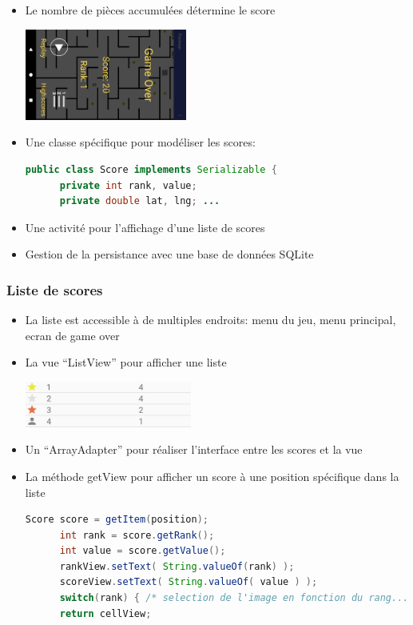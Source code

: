 \documentclass[handout]{beamer}
\begin{document}
\begin{frame}[fragile]
  \frametitle<1->{}
    \begin{itemize}
    \item <1->{Le nombre de pièces accumulées détermine le score}
    \begin{center}
      \includegraphics[height=30mm]{game_over.png}
    \end{center}
    \item <2->{Une classe spécifique pour modéliser les scores:}
    \begin{lstlisting}[language=java]
      public class Score implements Serializable {
      private int rank, value;
      private double lat, lng; ...
    \end{lstlisting}
    \item <3->{Une activité pour l'affichage d'une liste de scores}
    \item <2->{Gestion de la persistance avec une base de données SQLite}
    \end{itemize}
\end{frame}

\begin{frame}[fragile]
  \frametitle<1->{Liste de scores}
  \begin{itemize}
    \item <1->{La liste est accessible à de multiples endroits: menu du jeu, menu principal, ecran de game over}
    \item <2->{La vue \enquote{ListView} pour afficher une liste}
    \begin{center}
      \includegraphics[height=15mm]{scores_list.png}
    \end{center}
    \item <3->{Un \enquote{ArrayAdapter} pour réaliser l'interface entre les scores et la vue}%
    \item <4->{La méthode getView pour afficher un score à une position spécifique dans la liste}
    \begin{lstlisting}[language=java]
      Score score = getItem(position);
      int rank = score.getRank();
      int value = score.getValue();
      rankView.setText( String.valueOf(rank) );
      scoreView.setText( String.valueOf( value ) );
      switch(rank) { /* selection de l'image en fonction du rang... */ }
      return cellView;
    \end{lstlisting}
  \end{itemize}
\end{frame}
\end{document}
